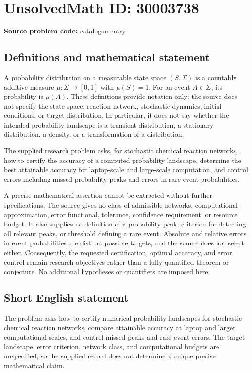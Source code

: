 \documentclass[11pt]{article}
\begin{document}
\section*{UnsolvedMath ID: 30003738}
\textbf{Source problem code:} catalogue entry
\subsection{Definitions and mathematical statement}
A probability distribution on a measurable state space \((S,\Sigma)\) is a countably additive measure \(\mu:\Sigma\to[0,1]\) with \(\mu(S)=1\). For an event \(A\in\Sigma\), its probability is \(\mu(A)\). These definitions provide notation only: the source does not specify the state space, reaction network, stochastic dynamics, initial conditions, or target distribution. In particular, it does not say whether the intended probability landscape is a transient distribution, a stationary distribution, a density, or a transformation of a distribution.

The supplied research problem asks, for stochastic chemical reaction networks, how to certify the accuracy of a computed probability landscape, determine the best attainable accuracy for laptop-scale and large-scale computation, and control errors including missed probability peaks and errors in rare-event probabilities.

A precise mathematical assertion cannot be extracted without further specifications. The source gives no class of admissible networks, computational approximation, error functional, tolerance, confidence requirement, or resource budget. It also supplies no definition of a probability peak, criterion for detecting all relevant peaks, or threshold defining a rare event. Absolute and relative errors in event probabilities are distinct possible targets, and the source does not select either. Consequently, the requested certification, optimal accuracy, and error control remain research objectives rather than a fully quantified theorem or conjecture. No additional hypotheses or quantifiers are imposed here.
\subsection{Short English statement}
The problem asks how to certify numerical probability landscapes for stochastic chemical reaction networks, compare attainable accuracy at laptop and larger computational scales, and control missed peaks and rare-event errors. The target landscape, error criterion, network class, and computational budgets are unspecified, so the supplied record does not determine a unique precise mathematical claim.
\end{document}

